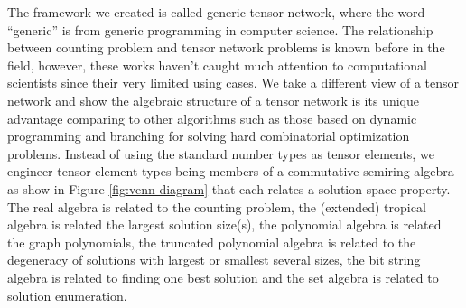 \documentclass[a4paper]{article}
\newcommand{\<}{\langle}
\renewcommand{\>}{\rangle}
\begin{document}
The framework we created is called generic tensor network, where the word ``generic'' is from generic programming in computer science.
The relationship between counting problem and tensor network problems is known before in the field, however, these works haven't caught much attention to computational scientists since their very limited using cases.
We take a different view of a tensor network and show the algebraic structure of a tensor network is its unique advantage comparing to other algorithms such as those based on dynamic programming and branching for solving hard combinatorial optimization problems.
Instead of using the standard number types as tensor elements, we engineer tensor element types being members of a commutative semiring algebra as show in Figure \ref{fig:venn-diagram} that each relates a solution space property.
The real algebra is related to the counting problem, the (extended) tropical algebra is related the largest solution size(s), the polynomial algebra is related the graph polynomials, the truncated polynomial algebra is related to the degeneracy of solutions with largest or smallest several sizes, the bit string algebra is related to finding one best solution and the set algebra is related to solution enumeration.
\end{document}

